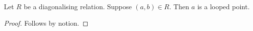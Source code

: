 

\begin{proposition}\label{reduced_present}
    Let $R$ be a diagonalising relation.
    Suppose $(a,b)\in R$.
    Then $a$ is a looped point.
\end{proposition}
\begin{proof}
    Follows by notion.
\end{proof}

